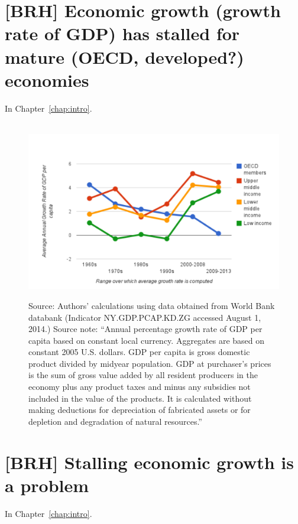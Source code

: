 \section{[BRH] Economic growth (growth rate of GDP) has stalled for mature (OECD, developed?) economies}
\label{sec:growth_has_slowed}

In Chapter~\ref{chap:intro}.

\begin{figure}[!ht]
\centering\
\includegraphics[width=\linewidth]{Part_0/Chapter_Introduction/images/GDPPC.pdf}
\caption[The traditional model]{Source: Authors' calculations using 
data obtained from World Bank databank (Indicator NY.GDP.PCAP.KD.ZG accessed August 1, 2014.)
Source note: ``Annual percentage growth rate of GDP per capita based on constant local currency. Aggregates are based on constant 2005 U.S. dollars. GDP per capita is gross domestic product divided by midyear population. GDP at purchaser's prices is the sum of gross value added by all resident producers in the economy plus any product taxes and minus any subsidies not included in the value of the products. It is calculated without making deductions for depreciation of fabricated assets or for depletion and degradation of natural resources.''}
\label{fig:gdppc}
\end{figure}


\section{[BRH] Stalling economic growth is a problem}
\label{sec:stall_is_a_problem}

In Chapter~\ref{chap:intro}.


